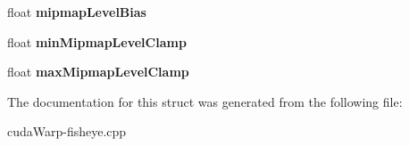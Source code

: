 \begin{DoxyCompactItemize}
\item 
float {\bfseries mipmap\+Level\+Bias}\hypertarget{structcudaTextureDesc_a39f79ca1c9fd8f476597df0d3a8ed34c}{}\label{structcudaTextureDesc_a39f79ca1c9fd8f476597df0d3a8ed34c}

\item 
float {\bfseries min\+Mipmap\+Level\+Clamp}\hypertarget{structcudaTextureDesc_a928642b629ae8fd8d2adc198979b6840}{}\label{structcudaTextureDesc_a928642b629ae8fd8d2adc198979b6840}

\item 
float {\bfseries max\+Mipmap\+Level\+Clamp}\hypertarget{structcudaTextureDesc_a9cb54762bd472fb9bd58fed7f22e64c2}{}\label{structcudaTextureDesc_a9cb54762bd472fb9bd58fed7f22e64c2}

\end{DoxyCompactItemize}


The documentation for this struct was generated from the following file\+:\begin{DoxyCompactItemize}
\item 
cuda\+Warp-\/fisheye.\+cpp\end{DoxyCompactItemize}
